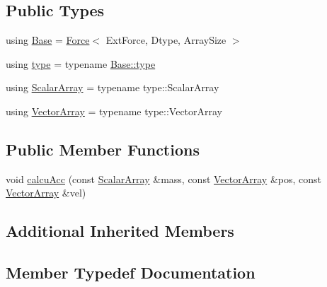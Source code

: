 \subsection*{Public Types}
\begin{DoxyCompactItemize}
\item 
using \mbox{\hyperlink{struct_space_h_1_1_ext_vel_dep_force_a92ddc0ad1001e17ef8b4f870be20cada}{Base}} = \mbox{\hyperlink{struct_space_h_1_1_force}{Force}}$<$ Ext\+Force, Dtype, Array\+Size $>$
\item 
using \mbox{\hyperlink{struct_space_h_1_1_ext_vel_dep_force_ace51228267cd84b498bef72f6a06b727}{type}} = typename \mbox{\hyperlink{struct_space_h_1_1_force_a151c6ae1ec7ad87825c2b6cc74aee5f2}{Base\+::type}}
\item 
using \mbox{\hyperlink{struct_space_h_1_1_ext_vel_dep_force_afb0d9418e7236855d8cd8ce883493c27}{Scalar\+Array}} = typename type\+::\+Scalar\+Array
\item 
using \mbox{\hyperlink{struct_space_h_1_1_ext_vel_dep_force_ac2320cdd3fdaad369c901e79ded11d31}{Vector\+Array}} = typename type\+::\+Vector\+Array
\end{DoxyCompactItemize}
\subsection*{Public Member Functions}
\begin{DoxyCompactItemize}
\item 
void \mbox{\hyperlink{struct_space_h_1_1_ext_vel_dep_force_a58775894138f5ebd1d7d7460183f6c1e}{calcu\+Acc}} (const \mbox{\hyperlink{struct_space_h_1_1_ext_vel_dep_force_afb0d9418e7236855d8cd8ce883493c27}{Scalar\+Array}} \&mass, const \mbox{\hyperlink{struct_space_h_1_1_ext_vel_dep_force_ac2320cdd3fdaad369c901e79ded11d31}{Vector\+Array}} \&pos, const \mbox{\hyperlink{struct_space_h_1_1_ext_vel_dep_force_ac2320cdd3fdaad369c901e79ded11d31}{Vector\+Array}} \&vel)
\end{DoxyCompactItemize}
\subsection*{Additional Inherited Members}


\subsection{Member Typedef Documentation}
\mbox{\label{struct_space_h_1_1_ext_vel_dep_force_a92ddc0ad1001e17ef8b4f870be20cada}} 
